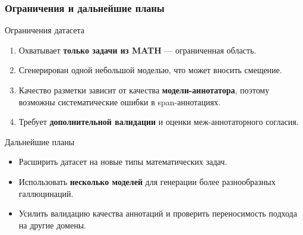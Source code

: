 \documentclass{beamer}
\begin{document}
\begin{frame}
  \frametitle{Ограничения и дальнейшие планы}
  \footnotesize

  \begin{block}{Ограничения датасета}
      \begin{enumerate}
          \item Охватывает \textbf{только задачи из MATH} — ограниченная область.
          \item Сгенерирован одной небольшой моделью, что может вносить смещение.
          \item Качество разметки зависит от качества \textbf{модели-аннотатора}, поэтому возможны систематические ошибки в span-аннотациях.
          \item Требует \textbf{дополнительной валидации} и оценки меж-аннотаторного согласия.
      \end{enumerate}
  \end{block}

  \begin{block}{Дальнейшие планы}
      \begin{itemize}
          \item Расширить датасет на новые типы математических задач.
          \item Использовать \textbf{несколько моделей} для генерации более разнообразных галлюцинаций.
          \item Усилить валидацию качества аннотаций и проверить переносимость подхода на другие домены.
      \end{itemize}
  \end{block}
\end{frame}
\end{document}
